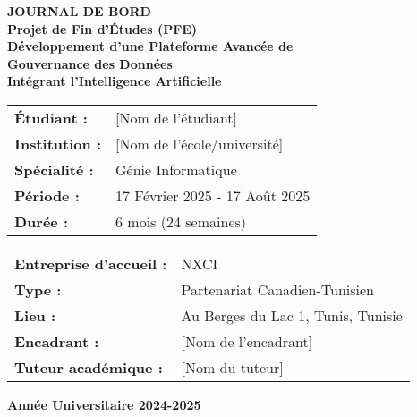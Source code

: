 \documentclass[12pt,a4paper]{article}
\begin{document}
\begin{titlepage}
    \centering
    \vspace*{2cm}
    
    {\Huge\bfseries\color{primaryblue} JOURNAL DE BORD}\\[0.5cm]
    {\Large\bfseries Projet de Fin d'Études (PFE)}\\[1cm]
    
    {\Large\bfseries Développement d'une Plateforme Avancée de}\\[0.3cm]
    {\Large\bfseries Gouvernance des Données}\\[0.3cm]
    {\Large\bfseries Intégrant l'Intelligence Artificielle}\\[1cm]
    
    \vspace{1cm}
    
    \begin{tabular}{ll}
        \textbf{Étudiant :} & [Nom de l'étudiant] \\
        \textbf{Institution :} & [Nom de l'école/université] \\
        \textbf{Spécialité :} & Génie Informatique \\
        \textbf{Période :} & 17 Février 2025 - 17 Août 2025 \\
        \textbf{Durée :} & 6 mois (24 semaines) \\
    \end{tabular}
    
    \vspace{1.5cm}
    
    \begin{tabular}{ll}
        \textbf{Entreprise d'accueil :} & NXCI \\
        \textbf{Type :} & Partenariat Canadien-Tunisien \\
        \textbf{Lieu :} & Au Berges du Lac 1, Tunis, Tunisie \\
        \textbf{Encadrant :} & [Nom de l'encadrant] \\
        \textbf{Tuteur académique :} & [Nom du tuteur] \\
    \end{tabular}
    
    \vfill
    
    {\large\bfseries\color{textgray} Année Universitaire 2024-2025}
    
\end{titlepage}

\tableofcontents
\newpage
\end{document}
